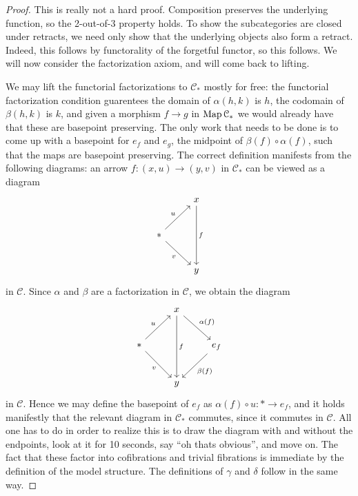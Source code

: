 \begin{proof}
	This is really not a hard proof. Composition preserves the underlying function, so the 2-out-of-3 property holds. To show the subcategories are closed under retracts, we need only show that the underlying objects also form a retract. Indeed, this follows by functorality of the forgetful functor, so this follows. We will now consider the factorization axiom, and will come back to lifting.

	We may lift the functorial factorizations to $\mathcal{C} _*$ mostly for free: the functorial factorization condition guarentees the domain of $\alpha(h,k)$ is $h$, the codomain of $\beta(h,k)$ is $k$, and given a morphism $f\to g$ in $\operatorname{Map} \mathcal{C}_*$ we would already have that these are basepoint preserving. The only work that needs to be done is to come up with a basepoint for $e_f$ and $e_g$, the midpoint of $\beta(f)\circ \alpha(f)$, such that the maps are basepoint preserving. The correct definition manifests from the following diagrams: an arrow $f : (x,u) \to (y,v)$ in $\mathcal{C} _*$ can be viewed as a diagram
	\[\begin{tikzcd}[row sep = 2.5em, column sep = 2.5em]
	 & x \ar[" f ", dd]  \\
	*\ar[" u ", ur] \ar[" v "', dr]  &  \\
	 & y
	\end{tikzcd}\]
	in $\mathcal{C} $. Since $\alpha$ and $\beta$ are a factorization in $\mathcal{C} $, we obtain the diagram
	\[\begin{tikzcd}[row sep = 2.5em, column sep = 2.5em]
	 & x \ar[" f ", dd] \ar[" \alpha(f) ", dr]  &  \\
	* \ar[" u ", ur] \ar[" v "', dr]  &  & e_f \ar[" \beta(f) ", dl]  \\
	 & y & 
	\end{tikzcd}\]
	in $\mathcal{C} $. Hence we may define the basepoint of $e_f$ as $\alpha(f)\circ u : * \to e_f$, and it holds manifestly that the relevant diagram in $\mathcal{C} _*$ commutes, since it commutes in $\mathcal{C} $. All one has to do in order to realize this is to draw the diagram with and without the endpoints, look at it for 10 seconds, say ``oh thats obvious'', and move on. The fact that these factor into cofibrations and trivial fibrations is immediate by the definition of the model structure. The definitions of $\gamma$ and $\delta$ follow in the same way.


\end{proof}
